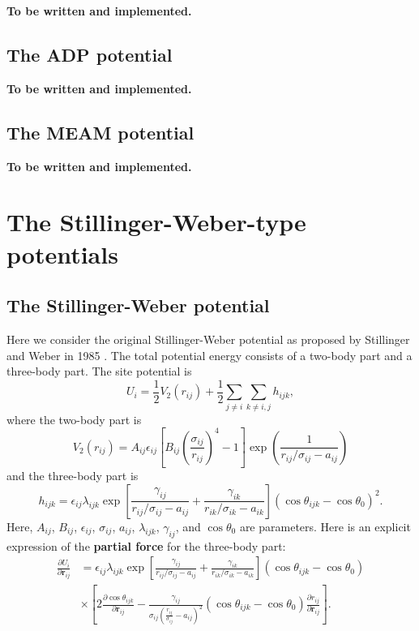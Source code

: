 \documentclass[12pt,a4paper]{report}
\newcommand{\vect}[1]{\boldsymbol{#1}}
\begin{document}
\textbf{To be written and implemented.}

\subsection{The ADP potential}

\textbf{To be written and implemented.}

\subsection{The MEAM potential}

\textbf{To be written and implemented.}


\section{The Stillinger-Weber-type potentials}

\subsection{The Stillinger-Weber potential}

Here we consider the original Stillinger-Weber potential as proposed by Stillinger and Weber in 1985 \cite{stillinger1985prb}.
The total potential energy consists of a two-body part and a three-body part. The site potential is
\begin{equation}
U_i = \frac{1}{2} V_2(r_{ij}) + \frac{1}{2}\sum_{j\neq i}\sum_{k\neq i,j} h_{ijk},
\end{equation}
where the two-body part is
\begin{equation}
V_2(r_{ij}) =  A_{ij} \epsilon_{ij}
\left[
  B_{ij} \left( \frac{\sigma_{ij} }{ r_{ij} } \right)^{4}-1
\right]
\exp\left(   \frac{1}{ r_{ij} / \sigma_{ij} - a_{ij}} \right)
\end{equation}
and the three-body part is
\begin{equation}
h_{ijk}=\epsilon_{ij}\lambda_{ijk}
\exp
\left[
\frac{\gamma_{ij}}{r_{ij}/\sigma_{ij}-a_{ij}} + \frac{\gamma_{ik}}{r_{ik}/\sigma_{ik}-a_{ik}}
\right]
         \left(\cos \theta_{ijk} - \cos \theta_{0} \right)^2.
\end{equation}
Here, $A_{ij}$, $B_{ij}$, $\epsilon_{ij}$, $\sigma_{ij}$, $a_{ij}$, $\lambda_{ijk}$, $\gamma_{ij}$, and $\cos \theta_{0}$ are parameters. Here is an explicit expression of the \textbf{partial force} for the three-body part:
\begin{align}
\frac{\partial U_i}{\partial \vect{r}_{ij}}
&= \epsilon_{ij}\lambda_{ijk} \exp \left[
 \frac{\gamma_{ij}}{r_{ij}/\sigma_{ij}-a_{ij}} + \frac{\gamma_{ik}}{r_{ik}/\sigma_{ik}-a_{ik}}
\right] \left(\cos \theta_{ijk} - \cos \theta_{0} \right) \nonumber \\
&\times
\left[
  2 \frac{\partial \cos \theta_{ijk}} {\partial \vect{r}_{ij}} -
  \frac{\gamma_{ij}}{\sigma_{ij} \left( \frac{r_{ij}}{\sigma_{ij}} - a_{ij} \right)^2}
  \left(\cos \theta_{ijk} - \cos \theta_{0} \right)
  \frac{\partial r_{ij}} {\partial \vect{r}_{ij}}
\right].
\end{align}
\end{document}
